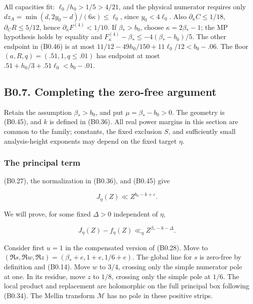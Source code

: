 \documentclass[11pt,a4paper]{article}
\begin{document}
All capacities fit: \(\ell_0/h_0>1/5>4/21\), and the physical numerator
requires only \(dz_A=\min(d,\allowbreak{}2y_0-d)/(6\kappa)\le\ell_0\), since
\(y_0<4\ell_0\). Also \(\partial_\kappa C\le1/18\),
\(\partial_C R\le5/12\), hence \(\partial_\kappa F^{(4)}<1/10\). If
\(\beta_*>b_0\), choose \(\kappa=2\beta_*-1\); the MP hypothesis holds
by equality and \(F^{(4)}_\kappa-\beta_*\le-4(\beta_*-b_0)/5\). The
other endpoint in (B0.46) is at most
\(11/12-49h_0/150+11\ell_0/12<b_0-.06\). The floor
\((a,\allowbreak{}R,\allowbreak{}q)=(.51,\allowbreak{}1,\allowbreak{}q\le.01)\) has endpoint at most
\(.51+h_0/3+.51\ell_0<b_0-.01\).

\hypertarget{b0.7.-completing-the-zero-free-argument}{%
\subsection{B0.7. Completing the zero-free
argument}\label{b0.7.-completing-the-zero-free-argument}}

Retain the assumption \(\beta_*>b_0\), and put \(\mu=\beta_*-b_0>0\).
The geometry is (B0.45), and \(k\) is defined in (B0.36). All real power
margins in this section are common to the family; constants, the fixed
exclusion \(S\), and sufficiently small analysis-height exponents may
depend on the fixed target \(\eta\).

\hypertarget{the-principal-term}{%
\subsubsection{The principal term}\label{the-principal-term}}

(B0.27), the normalization in (B0.36), and (B0.45) give

\[
J_\eta(Z)\ll Z^{b_0-k+\varepsilon}.
\tag{B0.50}
\]

We will prove, for some fixed \(\Delta>0\) independent of \(\eta\),

\[
J_\eta(Z)-f_\eta(Z)\ll_\eta Z^{\beta_*-k-\Delta}.
\tag{B0.51}
\]

Consider first \(u=1\) in the compensated version of (B0.28). Move to
\((\Re s,\allowbreak{}\Re w,\allowbreak{}\Re z)=(\beta_*+e,\allowbreak{}1+e,\allowbreak{}1/6+e)\). The global line for \(s\)
is zero-free by definition and (B0.14). Move \(w\) to \(3/4\), crossing
only the simple numerator pole at one. In its residue, move \(z\) to
\(1/8\), crossing only the simple pole at \(1/6\). The local product and
replacement are holomorphic on the full principal box following (B0.34).
The Mellin transform \(\mathscr M\) has no pole in these positive
strips.
\end{document}
